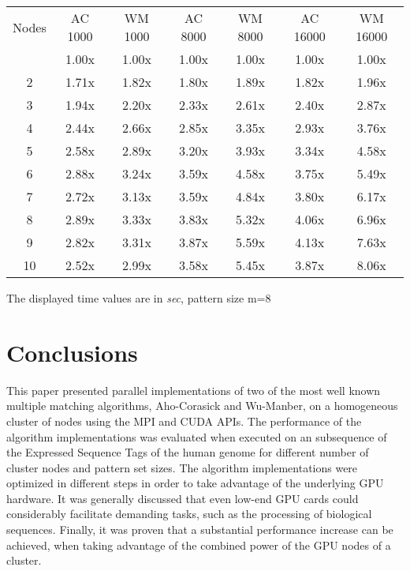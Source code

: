 \documentclass{ws-ijait}
\begin{document}
\begin{table}[h]
{\begin{tabular}{@{}c | cc |cc|cc@{}} \toprule
Nodes & AC 1000 & WM 1000 & AC 8000 & WM 8000 & AC 16000 & WM 16000\\
\colrule
1 & 1.00x & 1.00x & 1.00x & 1.00x & 1.00x & 1.00x\\
2 & 1.71x & 1.82x & 1.80x & 1.89x & 1.82x & 1.96x\\
3 & 1.94x & 2.20x & 2.33x & 2.61x & 2.40x & 2.87x\\
4 & 2.44x & 2.66x & 2.85x & 3.35x & 2.93x & 3.76x\\
5 & 2.58x & 2.89x & 3.20x & 3.93x & 3.34x & 4.58x\\
6 & 2.88x & 3.24x & 3.59x & 4.58x & 3.75x & 5.49x\\
7 & 2.72x & 3.13x & 3.59x & 4.84x & 3.80x & 6.17x\\
8 & 2.89x & 3.33x & 3.83x & 5.32x & 4.06x & 6.96x\\
9 & 2.82x & 3.31x & 3.87x & 5.59x & 4.13x & 7.63x\\
10 & 2.52x & 2.99x & 3.58x & 5.45x & 3.87x & 8.06x\\
\hline
\end{tabular}}
\begin{tabnote}
The displayed time values are in \textit{sec}, pattern size m=$8$
\end{tabnote}
\label{tbl:overall-execution-speedup}
\end{table}

 
 
 


\clearpage

\section{Conclusions}
\label{sec:conclusions}

This paper presented parallel implementations of two of the most well known multiple matching algorithms, Aho-Corasick and Wu-Manber, on a homogeneous cluster of nodes using the MPI and CUDA APIs. The performance of the algorithm implementations was evaluated when executed on an subsequence of the Expressed Sequence Tags of the human genome for different number of cluster nodes and pattern set sizes. The algorithm implementations were optimized in different steps in order to take advantage of the underlying GPU hardware. It was generally discussed that even low-end GPU cards could considerably facilitate demanding tasks, such as the processing of biological sequences. Finally, it was proven that a substantial performance increase can be achieved, when taking advantage of the combined power of the GPU nodes of a cluster.
\end{document}
